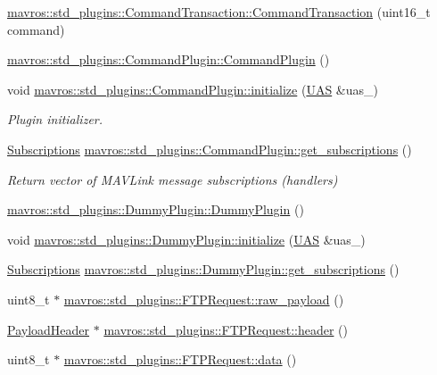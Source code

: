 \begin{DoxyCompactItemize}
\mbox{\hyperlink{group__plugin_ga658577aae97bc7739a5bfbd71e16af2e}{mavros\+::std\+\_\+plugins\+::\+Command\+Transaction\+::\+Command\+Transaction}} (uint16\+\_\+t command)
\item 
\mbox{\hyperlink{group__plugin_ga940a7bdc408198dd8571ee68b095b0f2}{mavros\+::std\+\_\+plugins\+::\+Command\+Plugin\+::\+Command\+Plugin}} ()
\item 
void \mbox{\hyperlink{group__plugin_ga4093176dbbf2e0118a02d423d19f9faf}{mavros\+::std\+\_\+plugins\+::\+Command\+Plugin\+::initialize}} (\mbox{\hyperlink{classmavros_1_1UAS}{U\+AS}} \&uas\+\_\+)
\begin{DoxyCompactList}\small\item\em Plugin initializer. \end{DoxyCompactList}\item 
\mbox{\hyperlink{group__plugin_ga8967d61fc77040e0c3ea5a4585d62a09}{Subscriptions}} \mbox{\hyperlink{group__plugin_ga359b17302f8aac303c17013d6fe7ea7f}{mavros\+::std\+\_\+plugins\+::\+Command\+Plugin\+::get\+\_\+subscriptions}} ()
\begin{DoxyCompactList}\small\item\em Return vector of M\+A\+V\+Link message subscriptions (handlers) \end{DoxyCompactList}\item 
\mbox{\hyperlink{group__plugin_ga86a0b9e56760d9d51fc5bfc8f3e358af}{mavros\+::std\+\_\+plugins\+::\+Dummy\+Plugin\+::\+Dummy\+Plugin}} ()
\item 
void \mbox{\hyperlink{group__plugin_gaea785dd0427ba4c5f2c0de94da43285f}{mavros\+::std\+\_\+plugins\+::\+Dummy\+Plugin\+::initialize}} (\mbox{\hyperlink{classmavros_1_1UAS}{U\+AS}} \&uas\+\_\+)
\item 
\mbox{\hyperlink{group__plugin_ga8967d61fc77040e0c3ea5a4585d62a09}{Subscriptions}} \mbox{\hyperlink{group__plugin_gaf24dcc35ae67b2e6842effce1e9c3803}{mavros\+::std\+\_\+plugins\+::\+Dummy\+Plugin\+::get\+\_\+subscriptions}} ()
\item 
uint8\+\_\+t $\ast$ \mbox{\hyperlink{group__plugin_ga5db0f34c632d274bb013df23cb8aa362}{mavros\+::std\+\_\+plugins\+::\+F\+T\+P\+Request\+::raw\+\_\+payload}} ()
\item 
\mbox{\hyperlink{structmavros_1_1std__plugins_1_1FTPRequest_1_1PayloadHeader}{Payload\+Header}} $\ast$ \mbox{\hyperlink{group__plugin_gacb2fd6b1a67b8f6d182b943f64af8802}{mavros\+::std\+\_\+plugins\+::\+F\+T\+P\+Request\+::header}} ()
\item 
uint8\+\_\+t $\ast$ \mbox{\hyperlink{group__plugin_ga8624be9f0794a1e686a06f68fe405bcd}{mavros\+::std\+\_\+plugins\+::\+F\+T\+P\+Request\+::data}} ()

\end{DoxyCompactItemize}
